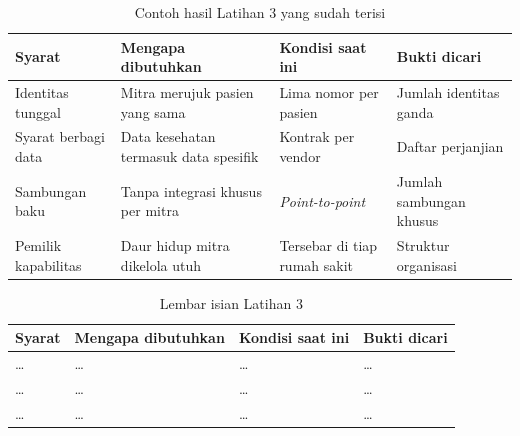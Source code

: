 \begin{table}[!htb]
  \centering
  \caption{Contoh hasil Latihan 3 yang sudah terisi}
  \label{tab:ch08-lat3-contoh}
  \begin{tabularx}{\textwidth}{>{\raggedright\arraybackslash}p{2.6cm}>{\raggedright\arraybackslash}X>{\raggedright\arraybackslash}X>{\raggedright\arraybackslash}p{2.4cm}}
    \hline
    \textbf{Syarat} & \textbf{Mengapa dibutuhkan} & \textbf{Kondisi saat ini} &
      \textbf{Bukti dicari} \\
    \hline
    Identitas tunggal & Mitra merujuk pasien yang sama & Lima nomor per pasien & Jumlah
      identitas ganda \\
    \hline
    Syarat berbagi data & Data kesehatan termasuk data spesifik & Kontrak per vendor &
      Daftar perjanjian \\
    \hline
    Sambungan baku & Tanpa integrasi khusus per mitra & \textit{Point-to-point} & Jumlah
      sambungan khusus \\
    \hline
    Pemilik kapabilitas & Daur hidup mitra dikelola utuh & Tersebar di tiap rumah sakit &
      Struktur organisasi \\
    \hline
  \end{tabularx}
\end{table}

\begin{table}[!htb]
  \centering
  \caption{Lembar isian Latihan 3}
  \label{tab:ch08-lat3-hasil}
  \begin{tabularx}{\textwidth}{>{\raggedright\arraybackslash}p{2.6cm}>{\raggedright\arraybackslash}X>{\raggedright\arraybackslash}X>{\raggedright\arraybackslash}p{2.4cm}}
    \hline
    \textbf{Syarat} & \textbf{Mengapa dibutuhkan} & \textbf{Kondisi saat ini} &
      \textbf{Bukti dicari} \\
    \hline
    \dots & \dots & \dots & \dots \\
    \hline
    \dots & \dots & \dots & \dots \\
    \hline
    \dots & \dots & \dots & \dots \\
    \hline
  \end{tabularx}
\end{table}
